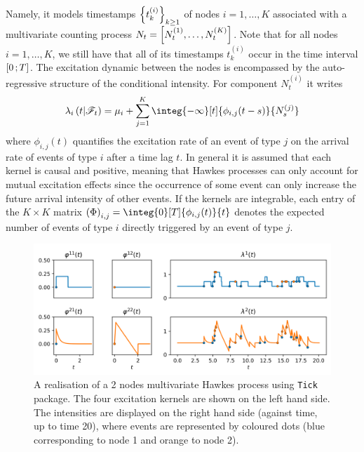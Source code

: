 Namely, it models timestamps $\left\lbrace t_k^{(i)} \right\rbrace_{k\geq 1}$ of nodes $i=1,\dots,K$ associated with a multivariate counting process $N_t = \left\lbrack N_t^{(1)}, \dots, N_t^{(K)} \right\rbrack$.
Note that for all nodes $i=1,\dots,K$, we still have that all of its timestamps $t_k^{(i)}$ occur in the time interval $\left[ 0 \, ; T \right]$.
The excitation dynamic between the nodes is encompassed by the auto-regressive structure of the conditional intensity.
For component $N_t^{(i)}$ it writes
\begin{equation}
    \lambda_i\pars{t \middle| \mathscr{F}_t} = \mu_i + \sum_{j=1}^K  \integ{-\infty}[t]{\phi_{i,j}(t-s)}{N_s^{(j)}}
\end{equation}
where $\phi_{i,j}(t)$ quantifies the excitation rate of an event of type $j$ on the arrival rate of events of type $i$ after a time lag $t$.
In general it is assumed that each kernel is causal and positive, meaning that Hawkes processes can only account for mutual excitation effects since the occurrence of some event can only increase the future arrival intensity of other events.
If the kernels are integrable, each entry of the $K\times K$ matrix ${\pars{\Phi}_{i,j} = \integ{0}[T]{\phi_{i,j}(t)}{t}}$ denotes the expected number of events of type $i$ directly triggered by an event of type $j$.

\begin{figure}[h]
    \centering
    \includegraphics[scale=0.35]{pics/simu_multi_hawkes.png}
    \caption{A realisation of a 2 nodes multivariate Hawkes process using \texttt{Tick} package. The four excitation kernels are shown on the left hand side. The intensities are displayed on the right hand side (against time, up to time 20), where events are represented by coloured dots (blue corresponding to node 1 and orange to node 2).}
    \label{fig:tick_hawkes_model}
\end{figure}

